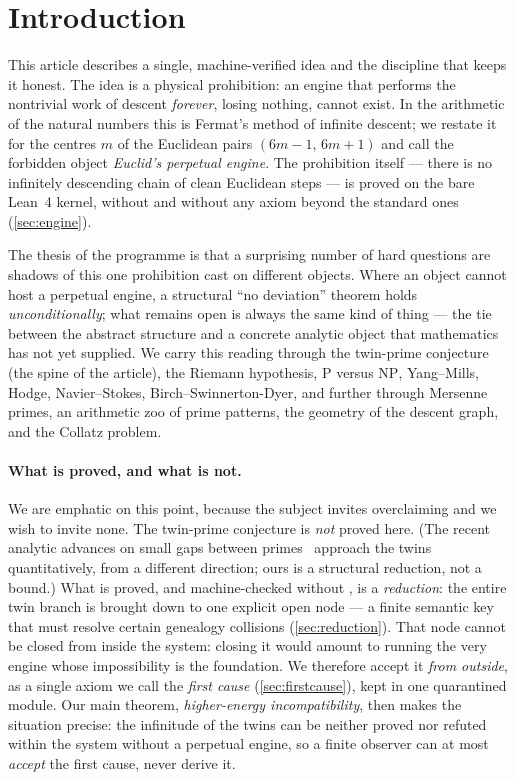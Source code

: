 \section{Introduction}
\label{sec:intro}

This article describes a single, machine-verified idea and the discipline that keeps it honest.
The idea is a physical prohibition: an engine that performs the nontrivial work of descent
\emph{forever}, losing nothing, cannot exist. In the arithmetic of the natural numbers this is
Fermat's method of infinite descent; we restate it for the centres $m$ of the Euclidean pairs
$(6m-1,\,6m+1)$ and call the forbidden object \emph{Euclid's perpetual engine}. The prohibition
itself --- there is no infinitely descending chain of clean Euclidean steps --- is proved on the
bare Lean~4 kernel, without  and without any axiom beyond the standard ones
(\cref{sec:engine}).

The thesis of the programme is that a surprising number of hard questions are shadows of this one
prohibition cast on different objects. Where an object cannot host a perpetual engine, a
structural ``no deviation'' theorem holds \emph{unconditionally}; what remains open is always the
same kind of thing --- the tie between the abstract structure and a concrete analytic object that
mathematics has not yet supplied. We carry this reading through the twin-prime conjecture (the
spine of the article), the Riemann hypothesis, $\mathrm{P}$ versus $\mathrm{NP}$, Yang--Mills,
Hodge, Navier--Stokes, Birch--Swinnerton-Dyer, and further through Mersenne primes, an arithmetic
zoo of prime patterns, the geometry of the descent graph, and the Collatz problem.

\paragraph{What is proved, and what is not.}
We are emphatic on this point, because the subject invites overclaiming and we wish to invite
none. The twin-prime conjecture is \emph{not} proved here. (The recent analytic advances on small gaps
between primes~\cite{gpy2009,zhang2014,maynard2015} approach the twins quantitatively, from a
different direction; ours is a structural reduction, not a bound.) What is proved, and machine-checked
without , is a \emph{reduction}: the entire twin branch is brought down to one
explicit open node --- a finite semantic key that must resolve certain genealogy collisions
(\cref{sec:reduction}). That node cannot be closed from inside the system: closing it would amount
to running the very engine whose impossibility is the foundation. We therefore accept it
\emph{from outside}, as a single axiom we call the \emph{first cause} (\cref{sec:firstcause}),
kept in one quarantined module. Our main theorem, \emph{higher-energy incompatibility}, then makes
the situation precise: the infinitude of the twins can be neither proved nor refuted within the
system without a perpetual engine, so a finite observer can at most \emph{accept} the first cause,
never derive it.

